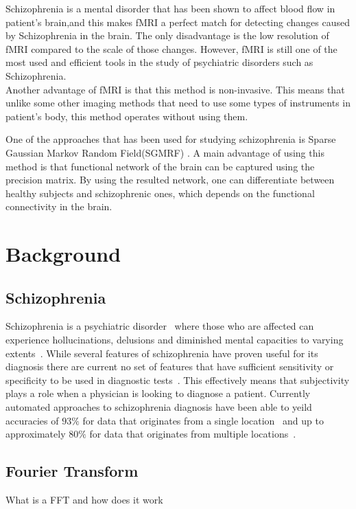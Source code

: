 \documentclass{article} %
\begin{document}
Schizophrenia is a mental disorder that has been shown to affect blood flow in patient's brain\cite{Kenji_2010},and this makes fMRI a perfect match for detecting changes caused by Schizophrenia in the brain. The only disadvantage is the low resolution of fMRI compared to the scale of those changes. However, fMRI is still one of the most used and efficient tools in the study of psychiatric disorders such as Schizophrenia.   \\

Another advantage of fMRI is that this method is non-invasive. This means that unlike some other imaging methods that need to use some types of instruments in patient's body, this method operates without using them. 

One of the approaches that has been used for studying schizophrenia is Sparse Gaussian Markov Random Field(SGMRF) \cite{Rish_2013}\cite{Rosa_2013}. A main advantage of using this method is that functional network of the brain can be captured using the precision matrix. \cite{Rish_2013} 
By using the resulted network, one can differentiate between healthy subjects and schizophrenic ones, which depends on the functional connectivity in the brain.      


\section{Background}

\subsection{Schizophrenia}
Schizophrenia is a psychiatric disorder~\cite{Rish_2013} where those who are 
affected can experience hollucinations, delusions and diminished mental 
capacities to varying extents~\cite{jablensky2010diagnostic}. While several
features of schizophrenia have proven useful for its diagnosis there are
current no set of features that have sufficient sensitivity or specificity
to be used in diagnostic tests~\cite{jablensky2010diagnostic}. This 
effectively means that subjectivity plays a role when a physician is
looking to diagnose a patient. Currently automated approaches to schizophrenia
diagnosis have  been able to yeild accuracies of $93\%$ for data that 
originates from a single location~\cite{Rish_2013} and up to approximately 
$80\%$ for data that originates from multiple locations~\cite{Cheng2015}.

\subsection{Fourier Transform}
What is a FFT and how does it work
\end{document}
